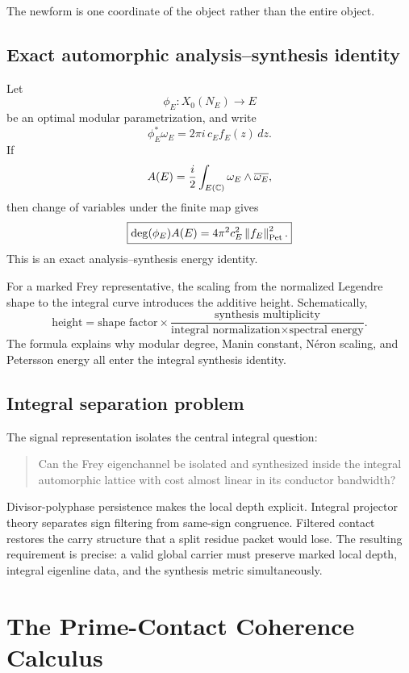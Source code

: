 The newform is one coordinate of the object rather than the entire object.

\section{Exact automorphic analysis--synthesis identity}
Let
\[
\phi_E:X_0(N_E)\longrightarrow E
\]
be an optimal modular parametrization, and write
\[
\phi_E^*\omega_E
=
2\pi i\,c_Ef_E(z)\,dz.
\]
If
\[
A(E)
=
\frac{i}{2}
\int_{E(\mathbb C)}\omega_E\wedge\overline{\omega_E},
\]
then change of variables under the finite map gives
\[
\boxed{
\deg(\phi_E)A(E)
=
4\pi^2c_E^2\left\lVert f_E\right\rVert_{\mathrm{Pet}}^2.
}
\]
This is an exact analysis--synthesis energy identity.

For a marked Frey representative, the scaling from the normalized Legendre shape to the integral curve introduces the additive height. Schematically,
\[
\boxed{
\text{height}
=
\text{shape factor}
\times
\frac{\text{synthesis multiplicity}}
{\text{integral normalization}\times\text{spectral energy}}.
}
\]
The formula explains why modular degree, Manin constant, N\'eron scaling, and Petersson energy all enter the integral synthesis identity.

\section{Integral separation problem}
The signal representation isolates the central integral question:

\begin{quote}
Can the Frey eigenchannel be isolated and synthesized inside the integral automorphic lattice with cost almost linear in its conductor bandwidth?
\end{quote}

Divisor-polyphase persistence makes the local depth explicit. Integral projector theory separates sign filtering from same-sign congruence. Filtered contact restores the carry structure that a split residue packet would lose. The resulting requirement is precise: a valid global carrier must preserve marked local depth, integral eigenline data, and the synthesis metric simultaneously.

\chapter{The Prime-Contact Coherence Calculus}

